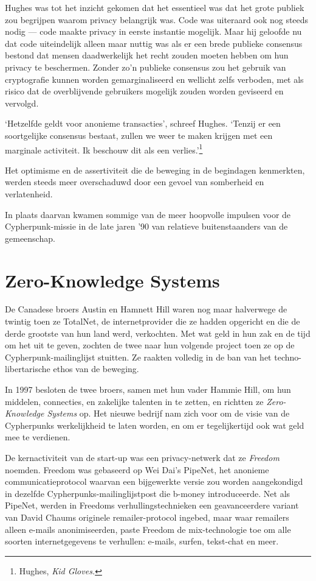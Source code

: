\documentclass[
  a5paper,
  smalldemyvopaper,11pt,twoside,onecolumn,openright,extrafontsizes,
hidelinks]{memoir}
\begin{document}
Hughes was tot het inzicht gekomen dat het essentieel was dat het grote
publiek zou begrijpen waarom privacy belangrijk was. Code was uiteraard
ook nog steeds nodig --- code maakte privacy in eerste instantie
mogelijk. Maar hij geloofde nu dat code uiteindelijk alleen maar nuttig
was als er een brede publieke consensus bestond dat mensen daadwerkelijk
het recht zouden moeten hebben om hun privacy te beschermen. Zonder zo'n
publieke consensus zou het gebruik van cryptografie kunnen worden
gemarginaliseerd en wellicht zelfs verboden, met als risico dat de
overblijvende gebruikers mogelijk zouden worden geviseerd en vervolgd.

`Hetzelfde geldt voor anonieme transacties', schreef Hughes. `Tenzij er
een soortgelijke consensus bestaat, zullen we weer te maken krijgen met
een marginale activiteit. Ik beschouw dit als een verlies.'\footnote{Hughes,
  \emph{Kid Gloves.}}

Het optimisme en de assertiviteit die de beweging in de begindagen
kenmerkten, werden steeds meer overschaduwd door een gevoel van
somberheid en verlatenheid.

In plaats daarvan kwamen sommige van de meer hoopvolle impulsen voor de
Cypherpunk-missie in de late jaren '90 van relatieve buitenstaanders van
de gemeenschap.

\section{Zero-Knowledge Systems}\label{zero-knowledge-systems}

De Canadese broers Austin en Hamnett Hill waren nog maar halverwege de
twintig toen ze TotalNet, de internetprovider die ze hadden opgericht en
die de derde grootste van hun land werd, verkochten. Met wat geld in hun
zak en de tijd om het uit te geven, zochten de twee naar hun volgende
project toen ze op de Cypherpunk-mailinglijst stuitten. Ze raakten
volledig in de ban van het techno-libertarische ethos van de beweging.

In 1997 besloten de twee broers, samen met hun vader Hammie Hill, om hun
middelen, connecties, en zakelijke talenten in te zetten, en richtten ze
\emph{Zero-Knowledge Systems} op. Het nieuwe bedrijf nam zich voor om de
visie van de Cypherpunks werkelijkheid te laten worden, en om er
tegelijkertijd ook wat geld mee te verdienen.

De kernactiviteit van de start-up was een privacy-netwerk dat ze
\emph{Freedom} noemden. Freedom was gebaseerd op Wei Dai's PipeNet, het
anonieme communicatieprotocol waarvan een bijgewerkte versie zou worden
aangekondigd in dezelfde Cypherpunks-mailinglijstpost die b-money
introduceerde. Net als PipeNet, werden in Freedoms verhullingstechnieken
een geavanceerdere variant van David Chaums originele remailer-protocol
ingebed, maar waar remailers alleen e-mails anonimiseerden, paste
Freedom de mix-technologie toe om alle soorten internetgegevens te
verhullen: e-mails, surfen, tekst-chat en meer.
\end{document}
